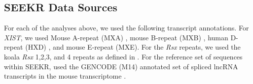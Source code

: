 \subsection{SEEKR Data Sources}
For each of the analyses above, we used the following transcript annotations. For \emph{XIST}, we used Mouse A-repeat (MXA) \cite{Brockdorff10TheNucleus.}, mouse B-repeat (MXB) \cite{Brockdorff10TheNucleus.}, human D-repeat (HXD) \cite{Brown10TheNucleus.}, and mouse E-repeat (MXE)\cite{Brockdorff10TheNucleus.}. For the \emph{Rsx} repeats, we used the koala \emph{Rsx} 1,2,3, and 4 repeats as defined in \cite{Sprague2019NonlinearDomains}. For the reference set of sequences within SEEKR, used the GENCODE (M14) annotated set of spliced lncRNA transcripts in the mouse transcriptome \cite{Derrien2012TheExpression}. 


\begin{singlespace}
\printbibliography[heading=bibintoc,title={References}]
\end{singlespace}